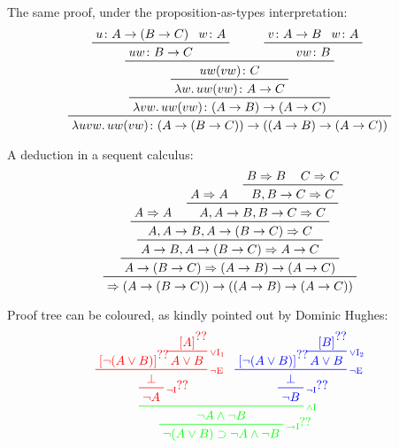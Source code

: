 \documentclass{amsart}
\begin{document}
The same proof, under the proposition-as-types interpretation:
\begin{displaymath}
  \prftree
  {\prftree
    {\prftree
      {\prftree
        {\prftree
          {\prfassumption{u\colon A \rightarrow (B \rightarrow C)}}
          {\prfassumption{w\colon A}}
          {u w\colon B \rightarrow C}\hspace{2em}}
        {\prftree
          {\prfassumption{v\colon A \rightarrow B}}
          {\prfassumption{w\colon A}}
          {v w\colon B}}
        {u w(v w)\colon C}}
      {\lambda w.\, u w(v w)\colon A \rightarrow C}}
    {\lambda v w.\, u w(v w)\colon (A \rightarrow B) \rightarrow (A
      \rightarrow C)}}
  {\lambda u v w.\, u w(v w)\colon (A \rightarrow (B \rightarrow C))
    \rightarrow ((A \rightarrow B) \rightarrow (A \rightarrow C))}
\end{displaymath}

A deduction in a sequent calculus:
\begin{displaymath}
  \prfinterspace=1.2em
  \prftree
  {\prftree
    {\prftree
      {\prftree
        {\prfassumption{A \Rightarrow A}}
        {\prftree
          {\prfassumption{A \Rightarrow A}}
          {\prftree
            {B \Rightarrow B}
            {C \Rightarrow C}
            {B, B \rightarrow C \Rightarrow C}}
          {A, A \rightarrow B, B \rightarrow C \Rightarrow C}}
        {A, A \rightarrow B, A \rightarrow (B \rightarrow C)
          \Rightarrow C}}
      {A \rightarrow B, A \rightarrow (B \rightarrow C) \Rightarrow A 
        \rightarrow C}}
    {A \rightarrow (B \rightarrow C) \Rightarrow (A \rightarrow B) 
      \rightarrow (A \rightarrow C)}}
  {\Rightarrow (A \rightarrow (B \rightarrow C)) \rightarrow ((A
    \rightarrow B) \rightarrow (A \rightarrow C))}
\end{displaymath}

Proof tree can be coloured, as kindly pointed out by Dominic Hughes:
\begin{displaymath}
  \begin{prfenv}
    \color{green}\NDIMPIL{ex6:1}
    {\NDANDI
      {\color{red}\NDNOTIL{ex6:2}
        {\NDNOTE
          {\NDDL{ex6:1}{\neg (A \vee B)}}
          {\NDORIL
            {\NDDL{ex6:2}{A}}
            {A \vee B}}
          {\bot}}
        {\neg A}}
      {\color{blue}\NDNOTIL{ex6:3}
        {\NDNOTE
          {\NDDL{[l]ex6:1}{\neg (A \vee B)}}
          {\NDORIR
            {\NDDL{ex6:3}{B}}
            {A \vee B}}
          {\bot}}
        {\neg B}}
      {\neg A \wedge \neg B}}
    {\neg (A \vee B) \supset \neg A \wedge \neg B}
  \end{prfenv}
\end{displaymath}\vspace{.2ex}
\end{document}
